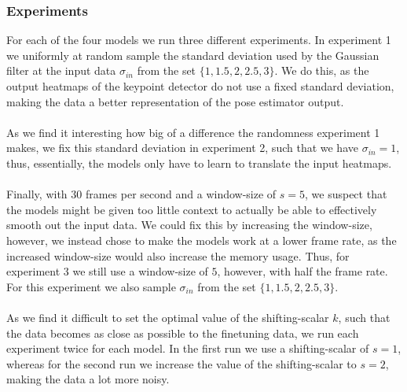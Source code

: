 \documentclass[./main.tex]{subfiles}
\begin{document}
\subsubsection{Experiments} For each of the four models we run three different experiments. In experiment 1 we uniformly at random sample the standard deviation used by the Gaussian filter at the input data $\sigma_{in}$ from the set $\{1, 1.5, 2, 2.5, 3\}$. We do this, as the output heatmaps of the keypoint detector do not use a fixed standard deviation, making the data a better representation of the pose estimator output. 
\\
\\
As we find it interesting how big of a difference the randomness experiment 1 makes, we fix this standard deviation in experiment 2, such that we have $\sigma_{in} = 1$, thus, essentially, the models only have to learn to translate the input heatmaps.
\\
\\
Finally, with $30$ frames per second and a window-size of $s = 5$, we suspect that the models might be given too little context to actually be able to effectively smooth out the input data. We could fix this by increasing the window-size, however, we instead chose to make the models work at a lower frame rate, as the increased window-size would also increase the memory usage. Thus, for experiment 3 we still use a window-size of $5$, however, with half the frame rate. For this experiment we also sample $\sigma_{in}$ from the set $\{1, 1.5, 2, 2.5, 3\}$.
\\
\\
As we find it difficult to set the optimal value of the shifting-scalar $k$, such that the data becomes as close as possible to the finetuning data, we run each experiment twice for each model. In the first run we use a shifting-scalar of $s = 1$, whereas for the second run we increase the value of the shifting-scalar to $s = 2$, making the data a lot more noisy.
\end{document}
